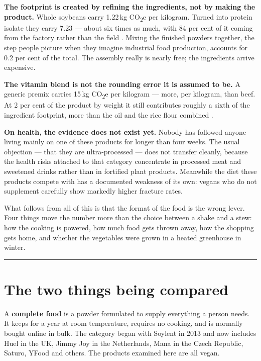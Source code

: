 \documentclass[11pt,a4paper]{article}
\newcommand{\co}{CO\textsubscript{2}e}
\begin{document}
\textbf{The footprint is created by refining the ingredients, not by making the
product.} Whole soybeans carry 1.22\,kg \co{} per kilogram. Turned into protein
isolate they carry 7.23 — about six times as much, with 84 per cent of it coming
from the factory rather than the field \cite{cc-spi}. Mixing the finished powders
together, the step people picture when they imagine industrial food production,
accounts for 0.2 per cent of the total. The assembly really is nearly free; the
ingredients arrive expensive.

\textbf{The vitamin blend is not the rounding error it is assumed to be.} A generic
premix carries 15\,kg \co{} per kilogram — more, per kilogram, than beef. At 2 per
cent of the product by weight it still contributes roughly a sixth of the ingredient
footprint, more than the oil and the rice flour combined \cite{cc-premix}.

\textbf{On health, the evidence does not exist yet.} Nobody has followed anyone
living mainly on one of these products for longer than four weeks. The usual
objection — that they are ultra-processed — does not transfer cleanly, because the
health risks attached to that category concentrate in processed meat and sweetened
drinks rather than in fortified plant products. Meanwhile the diet these products
compete with has a documented weakness of its own: vegans who do not supplement
carefully show markedly higher fracture rates.

What follows from all of this is that the format of the food is the wrong lever.
Four things move the number more than the choice between a shake and a stew: how the
cooking is powered, how much food gets thrown away, how the shopping gets home, and
whether the vegetables were grown in a heated greenhouse in winter.

\vspace{0.4em}
\noindent\textcolor{rule}{\rule{\textwidth}{0.8pt}}

\section{The two things being compared}

A \textbf{complete food} is a powder formulated to supply everything a person needs.
It keeps for a year at room temperature, requires no cooking, and is normally bought
online in bulk. The category began with Soylent in 2013 and now includes Huel in the
UK, Jimmy Joy in the Netherlands, Mana in the Czech Republic, Saturo, YFood and
others. The products examined here are all vegan.
\end{document}
